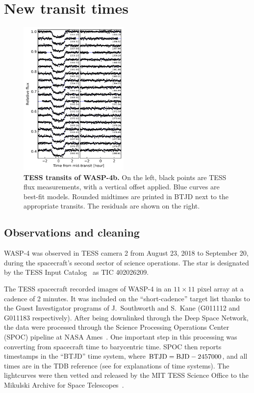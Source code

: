 \documentclass[12pt,twocolumn,tighten]{aastex62}
\begin{document}
\section{New transit times}
\label{sec:transits}

\begin{figure}[t]
    \begin{center}
        \includegraphics[width=0.48\textwidth]{f1.png}
    \end{center}
    \vspace{-0.5cm}
    \caption{
        {\bf TESS transits of WASP-4b.} On the left, black points are TESS
        flux measurements, with a vertical offset applied. Blue curves are
        best-fit models. Rounded midtimes are printed in BTJD
        next to the appropriate transits.  The residuals are shown on
        the right.
        \label{fig:lightcurves}
    }
\end{figure}

\subsection{Observations and cleaning}
WASP-4 was observed in TESS camera 2 from August 23, 2018 to September
20, during the spacecraft's second sector of science operations.  The
star is designated by the TESS Input
Catalog~\citep[TIC;][]{stassun_TIC_2018} as TIC 402026209.

The TESS spacecraft recorded images of WASP-4 in an $11\times11$
pixel array at a cadence of 2 minutes.  It was included on the
``short-cadence'' target list thanks to the Guest Investigator
programs of J.\ Southworth and S.\ Kane (G011112 and G011183
respectively).  After being downlinked through the Deep Space Network,
the data were processed through the Science Processing Operations
Center (SPOC) pipeline at NASA Ames~\citep{jenkins_tess_2016}.  One
important step in this processing was converting from spacecraft time
to barycentric time.  SPOC then reports timestamps in the ``BTJD''
time system, where ${\rm BTJD} = {\rm BJD} - 2457000$, and all times
are in the TDB reference (see \citealt{urban_explanatory_2012} for
explanations of time systems).  The lightcurves were then vetted
and released by the MIT TESS Science Office to the Mikulski Archive
for Space Telescopes~\citep{ricker_tess_alerts_2018}.
\end{document}
